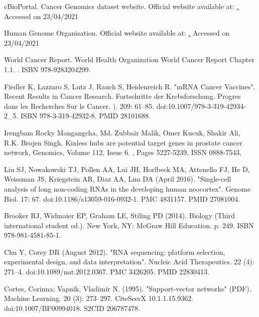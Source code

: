 \documentclass[12pt,a4paper]{report}
\begin{document}
\appendix


\begin{thebibliography}{HHM99}


cBioPortal. 
\newblock Cancer Genomics dataset website.  
\newblock Official website available at: \href{https://www.cbioportal.org/}. Accessed on 23/04/2021


Human Genome Organisation.
\newblock Official website available at: \href{https://bioportal.bioontology.org/ontologies/HUGO}.
\newblock Accessed on 23/04/2021
  
  
World Cancer Report.
\newblock World Health Organization World Cancer Report Chapter 1.1.
. ISBN 978-9283204299.

  
Fiedler K, Lazzaro S, Lutz J, Rauch S, Heidenreich R.
\newblock "mRNA Cancer Vaccines". Recent Results in Cancer Research. Fortschritte der Krebsforschung. Progres dans les Recherches Sur le Cancer.
). 209: 61–85. doi:10.1007/978-3-319-42934-2\_5. ISBN 978-3-319-42932-8. PMID 28101688.

Irengbam Rocky Mangangcha, Md. Zubbair Malik, Omer Kucuk, Shakir Ali, R.K. Brojen Singh. 
\newblock Kinless hubs are potential target genes in prostate cancer network,
Genomics,
Volume 112, Issue 6.
,
Pages 5227-5239,
ISSN 0888-7543,

Liu SJ, Nowakowski TJ, Pollen AA, Lui JH, Horlbeck MA, Attenello FJ, He D, Weissman JS, Kriegstein AR, Diaz AA, Lim DA (April 2016). "Single-cell analysis of long non-coding RNAs in the developing human neocortex". Genome Biol. 17: 67. doi:10.1186/s13059-016-0932-1. PMC 4831157. PMID 27081004.

Brooker RJ, Widmaier EP, Graham LE, Stiling PD (2014). Biology (Third international student ed.). New York, NY: McGraw Hill Education. p. 249. ISBN 978-981-4581-85-1.

Chu Y, Corey DR (August 2012). "RNA sequencing: platform selection, experimental design, and data interpretation". Nucleic Acid Therapeutics. 22 (4): 271–4. doi:10.1089/nat.2012.0367. PMC 3426205. PMID 22830413.


Cortes, Corinna; Vapnik, Vladimir N. (1995). "Support-vector networks" (PDF). Machine Learning. 20 (3): 273–297. CiteSeerX 10.1.1.15.9362. doi:10.1007/BF00994018. S2CID 206787478.



\end{thebibliography}
\end{document}
